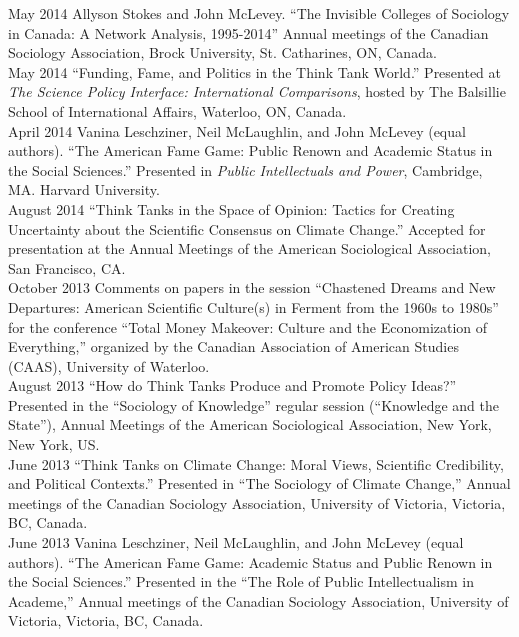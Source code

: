 \documentclass[9pt,usenames,dvipsnames]{article}
\begin{document}
\ind May 2014 Allyson Stokes and John McLevey. ``The Invisible Colleges of Sociology in Canada: A Network Analysis, 1995-2014'' Annual meetings of the Canadian Sociology Association, Brock University, St. Catharines, ON, Canada.\\

\ind May 2014 ``Funding, Fame, and Politics in the Think Tank World.'' Presented at \emph{The Science Policy Interface: International Comparisons}, hosted by The Balsillie School of International Affairs, Waterloo, ON, Canada. \\

\ind April 2014 Vanina Leschziner, Neil McLaughlin, and John McLevey (equal authors). ``The American Fame Game: Public Renown and Academic Status in the Social Sciences.'' Presented in \emph{Public Intellectuals and Power}, Cambridge, MA. Harvard University. \\

\ind August 2014 ``Think Tanks in the Space of Opinion: Tactics for Creating Uncertainty about the Scientific Consensus on Climate Change.'' Accepted for presentation at the Annual Meetings of the American Sociological Association, San Francisco, CA. \\

\ind October 2013 Comments on papers in the session ``Chastened Dreams and New Departures: American Scientific Culture(s) in Ferment from the 1960s to 1980s'' for the conference ``Total Money Makeover: Culture and the Economization of Everything,'' organized by the Canadian Association of American Studies (CAAS), University of Waterloo. \\

\ind August 2013 ``How do Think Tanks Produce and Promote Policy Ideas?'' Presented in the ``Sociology of Knowledge'' regular session (``Knowledge and the State''), Annual Meetings of the American Sociological Association, New York, New York, US. \\

\ind June 2013 ``Think Tanks on Climate Change: Moral Views, Scientific Credibility, and Political Contexts.'' Presented in ``The Sociology of Climate Change,'' Annual meetings of the Canadian Sociology Association, University of Victoria, Victoria, BC, Canada. \\

\ind June 2013 Vanina Leschziner, Neil McLaughlin, and John McLevey (equal authors). ``The American Fame Game: Academic Status and Public Renown in the Social Sciences.'' Presented in the ``The Role of Public Intellectualism in Academe,'' Annual meetings of the Canadian Sociology Association, University of Victoria, Victoria, BC, Canada. \\
\end{document}

